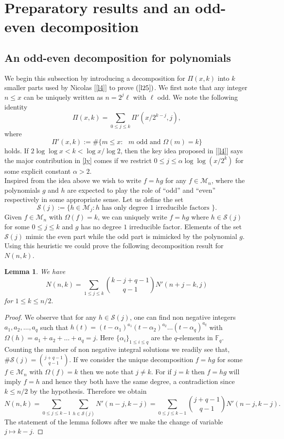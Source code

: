 \documentclass[12pt]{amsart}
\numberwithin{equation}{section}
\newtheorem{Lemma}[theorem]{Lemma}
\theoremstyle{remark}
\theoremstyle{remark}
\theoremstyle{definition}
\begin{document}
\section{Preparatory results and an odd-even decomposition}\label{ld}
\subsection{An odd-even decomposition for polynomials}
We begin this subsection by introducing a decomposition for $\Pi(x,k)$ into $k$ smaller parts used by Nicolas [\ref{l4}] to prove $(\ref{l25})$. We first note that any integer $n\leqslant x$ can be uniquely written as $n=2^j\ell$ with $\ell$ odd. We note the following identity 
\begin{equation}\label{ly}
\Pi(x,k)=\sum\limits_{0\leqslant j\leqslant k}\Pi'(x/2^{k-j},j),
\end{equation}
where \[\Pi'(x,k):= \#\bigg \{m\leqslant x:\text{ $m$ odd and }\Omega(m)=k \bigg \}\]
holds. If $2\log\log x<k<\log x/\log 2$, then the key idea proposed in [\ref{l4}] says the major contribution in \eqref{ly} comes if we restrict $0\leqslant j\leqslant \alpha\log\log (x/2^k)$ for some explicit constant $\alpha>2$.\\
Inspired from the idea above we wish to write $f=hg$ for any $f\in\mathcal{M}_n$, where the polynomials $g$ and $h$ are expected to play the role of ``odd'' and ``even'' respectively in some appropriate sense. Let us define the set
$$\mathcal{S}(j):=\bigg \{ h\in\mathcal{M}_j: h\text{ has only degree }1\text{ irreducible factors }\bigg \}.$$
Given $f\in\mathcal{M}_n$ with $\Omega(f)=k$, we can uniquely write $f=hg$ where $h\in\mathcal{S}(j)$ for some $0\leqslant j\leqslant k$ and $g$ has no degree $1$ irreducible factor. Elements of the set $\mathcal{S}(j)$ mimic the even part while the odd part is mimicked by the polynomial $g$. Using this heuristic we could prove the following decomposition result for $N(n,k)$.
\begin{Lemma}\label{led}
We have \[N(n,k)=\displaystyle\sum_{1\leqslant j\leqslant k} \binom{k-j+q-1}{q-1}N'(n+j-k,j)\] for $1\leqslant k\leqslant n/2.$
\end{Lemma}
\begin{proof}
We observe that for any $h\in \mathcal{S}(j)$, one can find non negative integers $a_1,a_2,\ldots,a_q$ such that $h(t)=(t-\alpha_1)^{a_1}(t-\alpha_2)^{a_2}\ldots(t-\alpha_q)^{a_q}$ with $\Omega(h)=a_1+a_2+\ldots+a_q=j$.
Here $\{\alpha_i\}_{1\leqslant i\leqslant q}$ are the $q$-elements in $\mathbb{F}_q.$ Counting the number of non negative integral solutions we readily see that, $\#\mathcal{S}(j)=\binom{j+q-1}{q-1}.$ If we consider the unique decomposition $f=hg$ for some $f\in\mathcal{M}_n$ with $\Omega(f)=k$ then we note that $j\neq k$. For if $j=k$ then $f=hg$ will imply $f=h$ and hence they both have the same degree, a contradiction since $k\leqslant n/2$ by the hypothesis. Therefore we obtain $$N(n,k)=\displaystyle\sum\limits_{0\leqslant j\leqslant k-1}\displaystyle\sum\limits_{h\in\mathcal{S}(j)}N'(n-j,k-j)=\displaystyle\sum\limits_{0\leqslant j\leqslant k-1}\binom{j+q-1}{q-1}N'(n-j,k-j).$$
The statement of the lemma follows after we make the change of variable $j\mapsto k-j.$
\end{proof}
\end{document}
